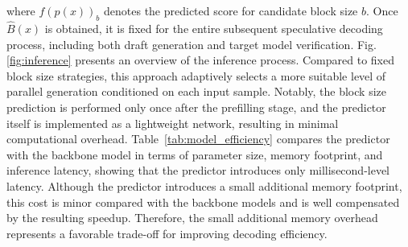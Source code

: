\documentclass{llmxive}
\begin{document}
where $f(p(x))_b$ denotes the predicted score for candidate block size $b$. Once $\hat{B}(x)$ is obtained, it is fixed for the entire subsequent speculative decoding process, including both draft generation and target model verification. Fig. \ref{fig:inference} presents an overview of the inference process. Compared to fixed block size strategies, this approach adaptively selects a more suitable level of parallel generation conditioned on each input sample. Notably, the block size prediction is performed only once after the prefilling stage, and the predictor itself is implemented as a lightweight network, resulting in minimal computational overhead. Table~\ref{tab:model_efficiency} compares the predictor with the backbone model in terms of parameter size, memory footprint, and inference latency, showing that the predictor introduces only millisecond-level latency. Although the predictor introduces a small additional memory footprint, this cost is minor compared with the backbone models and is well compensated by the resulting speedup. Therefore, the small additional memory overhead represents a favorable trade-off for improving decoding efficiency.
\end{document}
